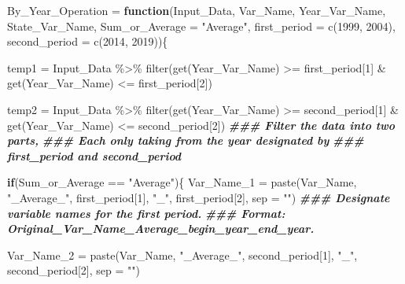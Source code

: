 \documentclass[
]{article}
\newenvironment{Shaded}{\begin{snugshade}}{\end{snugshade}}
\newcommand{\AttributeTok}[1]{\textcolor[rgb]{0.77,0.63,0.00}{#1}}
\newcommand{\ControlFlowTok}[1]{\textcolor[rgb]{0.13,0.29,0.53}{\textbf{#1}}}
\newcommand{\DecValTok}[1]{\textcolor[rgb]{0.00,0.00,0.81}{#1}}
\newcommand{\DocumentationTok}[1]{\textcolor[rgb]{0.56,0.35,0.01}{\textbf{\textit{#1}}}}
\newcommand{\FunctionTok}[1]{\textcolor[rgb]{0.00,0.00,0.00}{#1}}
\newcommand{\NormalTok}[1]{#1}
\newcommand{\OtherTok}[1]{\textcolor[rgb]{0.56,0.35,0.01}{#1}}
\newcommand{\SpecialCharTok}[1]{\textcolor[rgb]{0.00,0.00,0.00}{#1}}
\newcommand{\StringTok}[1]{\textcolor[rgb]{0.31,0.60,0.02}{#1}}
\begin{document}
\begin{Shaded}
\begin{Highlighting}[]
\NormalTok{By\_Year\_Operation }\OtherTok{=} \ControlFlowTok{function}\NormalTok{(Input\_Data, Var\_Name, }
\NormalTok{         Year\_Var\_Name, }
\NormalTok{         State\_Var\_Name, }\AttributeTok{Sum\_or\_Average =} \StringTok{"Average"}\NormalTok{,}
         \AttributeTok{first\_period =} \FunctionTok{c}\NormalTok{(}\DecValTok{1999}\NormalTok{, }\DecValTok{2004}\NormalTok{), }
         \AttributeTok{second\_period =} \FunctionTok{c}\NormalTok{(}\DecValTok{2014}\NormalTok{, }\DecValTok{2019}\NormalTok{))\{}
  
\NormalTok{  temp1 }\OtherTok{=}\NormalTok{ Input\_Data }\SpecialCharTok{\%\textgreater{}\%}
    \FunctionTok{filter}\NormalTok{(}\FunctionTok{get}\NormalTok{(Year\_Var\_Name) }\SpecialCharTok{\textgreater{}=}\NormalTok{ first\_period[}\DecValTok{1}\NormalTok{] }\SpecialCharTok{\&} 
             \FunctionTok{get}\NormalTok{(Year\_Var\_Name) }\SpecialCharTok{\textless{}=}\NormalTok{ first\_period[}\DecValTok{2}\NormalTok{])}
  
\NormalTok{  temp2 }\OtherTok{=}\NormalTok{ Input\_Data }\SpecialCharTok{\%\textgreater{}\%}
    \FunctionTok{filter}\NormalTok{(}\FunctionTok{get}\NormalTok{(Year\_Var\_Name) }\SpecialCharTok{\textgreater{}=}\NormalTok{ second\_period[}\DecValTok{1}\NormalTok{] }\SpecialCharTok{\&} 
             \FunctionTok{get}\NormalTok{(Year\_Var\_Name) }\SpecialCharTok{\textless{}=}\NormalTok{ second\_period[}\DecValTok{2}\NormalTok{])}
  \DocumentationTok{\#\#\# Filter the data into two parts,}
  \DocumentationTok{\#\#\# Each only taking from the year designated by }
  \DocumentationTok{\#\#\# first\_period and second\_period}
  
  \ControlFlowTok{if}\NormalTok{(Sum\_or\_Average }\SpecialCharTok{==} \StringTok{"Average"}\NormalTok{)\{}
\NormalTok{    Var\_Name\_1 }\OtherTok{=} \FunctionTok{paste}\NormalTok{(Var\_Name, }\StringTok{"\_Average\_"}\NormalTok{,}
\NormalTok{                             first\_period[}\DecValTok{1}\NormalTok{], }\StringTok{"\_"}\NormalTok{, first\_period[}\DecValTok{2}\NormalTok{],}
                             \AttributeTok{sep =} \StringTok{""}\NormalTok{)}
    \DocumentationTok{\#\#\# Designate variable names for the first period.}
    \DocumentationTok{\#\#\# Format: Original\_Var\_Name\_Average\_begin\_year\_end\_year.}
    
\NormalTok{    Var\_Name\_2 }\OtherTok{=} \FunctionTok{paste}\NormalTok{(Var\_Name, }\StringTok{"\_Average\_"}\NormalTok{,}
\NormalTok{                             second\_period[}\DecValTok{1}\NormalTok{], }\StringTok{"\_"}\NormalTok{, second\_period[}\DecValTok{2}\NormalTok{],}
                             \AttributeTok{sep =} \StringTok{""}\NormalTok{)}
    

\end{Highlighting}
\end{Shaded}
\end{document}
